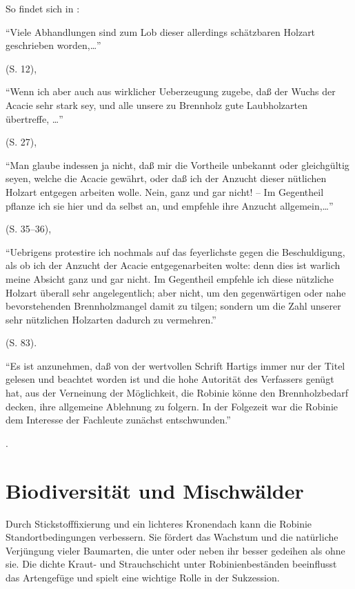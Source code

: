 \documentclass[twocolumn]{scrartcl}
\makeatletter
\newcommand{\summary}[1]{%
  \par %
  {\small\sffamily
    \noindent #1\par}
  \vspace{-0.4em}
  \noindent\makebox[\linewidth]{\rule{0.33\linewidth}{0.4pt}}\\[-1.2em]
  \@afterindentfalse\@afterheading
}
\makeatother
\begin{document}
So findet sich in \citet{hartig1798robinie}:

\hypertarget{german:hartig1798robinieA}{\enquote{Viele Abhandlungen sind zum Lob dieser allerdings schätzbaren
  Holzart geschrieben worden,\dots}} (S. 12),

\hypertarget{german:hartig1798robinieB}{\enquote{Wenn ich aber auch aus wirklicher Ueberzeugung zugebe, daß
  der Wuchs der Acacie sehr stark sey, und alle unsere zu Brennholz
  gute Laubholzarten übertreffe, \dots}} (S. 27),

\hypertarget{german:hartig1798robinieC}{\enquote{Man glaube indessen ja nicht, daß mir die Vortheile unbekannt
  oder gleichgültig seyen, welche die Acacie gewährt, oder daß ich der
  Anzucht dieser nütlichen Holzart entgegen arbeiten wolle.  Nein,
  ganz und gar nicht! -- Im Gegentheil pflanze ich sie hier und da
  selbst an, und empfehle ihre Anzucht allgemein,\dots}} (S. 35--36),

\hypertarget{german:hartig1798robinieD}{\enquote{Uebrigens protestire ich nochmals auf das feyerlichste gegen
  die Beschuldigung, als ob ich der Anzucht der Acacie
  entgegenarbeiten wolte: denn dies ist warlich meine Absicht ganz und
  gar nicht. Im Gegentheil empfehle ich diese nützliche Holzart
  überall sehr angelegentlich; aber nicht, um den gegenwärtigen oder
  nahe bevorstehenden Brennholzmangel damit zu tilgen; sondern um die
  Zahl unserer sehr nützlichen Holzarten dadurch zu vermehren.}}
(S. 83).

\hypertarget{german:erteld1952robinieErtragB}{\enquote{Es ist anzunehmen, daß von der wertvollen Schrift Hartigs
  immer nur der Titel gelesen und beachtet worden ist und die hohe
  Autorität des Verfassers genügt hat, aus der Verneinung der
  Möglichkeit, die Robinie könne den Brennholzbedarf decken, ihre
  allgemeine Ablehnung zu folgern. In der Folgezeit war die Robinie
  dem Interesse der Fachleute zunächst entschwunden.}}
\citep{erteld1952robinieErtrag}.


\section{Biodiversität und Mischwälder}

\summary{Durch Stickstofffixierung und ein lichteres Kronendach kann
  die Robinie Standortbedingungen verbessern. Sie fördert das Wachstum
  und die natürliche Verjüngung vieler Baumarten, die unter oder neben
  ihr besser gedeihen als ohne sie. Die dichte Kraut- und
  Strauchschicht unter Robinienbeständen beeinflusst das Artengefüge
  und spielt eine wichtige Rolle in der Sukzession.}
\end{document}
